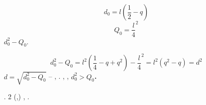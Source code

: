 \documentclass[a4paper]{article}
\begin{document}
\begin{equation*}
d_0=l\left(\frac 1 2-q\right)
\end{equation*}
\begin{equation*}
Q_0=\frac l 4^2
\end{equation*}
{\CYRR}{\cyra}{\cyrs}{\cyrs}{\cyrm}{\cyro}{\cyrt}{\cyrr}{\cyri}{\cyrm}
{\cyrk}{\cyro}{\cyrm}{\cyrb}{\cyri}{\cyrn}{\cyra}{\cyrc}{\cyri}{\cyryu}  $d_0^2-Q_0$.

\begin{equation*}
d_0^2-Q_0=l^2\left(\frac 1 4-q+q^2\right)-\frac l 4^2=l^2\left(q^2-q\right)=d^2
\end{equation*}
 $d=\sqrt{d_0^2-Q_0}$ -- {\cyrerev}{\cyrf}{\cyrf}{\cyre}{\cyrk}{\cyrt}{\cyri}{\cyrv}{\cyrn}{\cyrery}{\cyrishrt}
{\cyrd}{\cyri}{\cyrp}{\cyro}{\cyrl}{\cyrsftsn}{\cyrn}{\cyrery}{\cyrishrt} {\cyrm}{\cyro}{\cyrm}{\cyre}{\cyrn}{\cyrt},
{\cyri}{\cyrn}{\cyrv}{\cyra}{\cyrr}{\cyri}{\cyra}{\cyrn}{\cyrt}{\cyrn}{\cyrery}{\cyrishrt}
{\cyro}{\cyrt}{\cyrn}{\cyro}{\cyrs}{\cyri}{\cyrt}{\cyre}{\cyrl}{\cyrsftsn}{\cyrn}{\cyro}
{\cyrv}{\cyrery}{\cyrb}{\cyro}{\cyrr}{\cyra} {\cyrs}{\cyri}{\cyrs}{\cyrt}{\cyre}{\cyrm}{\cyrery}
{\cyro}{\cyrt}{\cyrs}{\cyrch}{\cyre}{\cyrt}{\cyra}. {\CYRO}{\cyrb}{\cyrr}{\cyra}{\cyrt}{\cyri}{\cyrm}
{\cyrv}{\cyrn}{\cyri}{\cyrm}{\cyra}{\cyrn}{\cyri}{\cyre} {\cyrn}{\cyra} {\cyrt}{\cyro}, {\cyrch}{\cyrt}{\cyro}
{\cyrt}{\cyra}{\cyrk}{\cyra}{\cyrya} {\cyrk}{\cyro}{\cyrm}{\cyrb}{\cyri}{\cyrn}{\cyra}{\cyrc}{\cyri}{\cyrya}
{\cyrs}{\cyru}{\cyrshch}{\cyre}{\cyrs}{\cyrt}{\cyrv}{\cyru}{\cyre}{\cyrt}
{\cyrt}{\cyro}{\cyrl}{\cyrsftsn}{\cyrk}{\cyro} {\cyrv} {\cyrt}{\cyro}{\cyrm}
{\cyrs}{\cyrl}{\cyru}{\cyrch}{\cyra}{\cyre}, {\cyre}{\cyrs}{\cyrl}{\cyri}  $d_0^2>Q_0$\textbf{.}

{\CYRN}{\cyra} {\cyrr}{\cyri}{\cyrs}. 2 ({\cyra},{\cyrb})
{\cyrp}{\cyrr}{\cyri}{\cyrv}{\cyre}{\cyrd}{\cyre}{\cyrn}{\cyro}
{\cyrs}{\cyrr}{\cyra}{\cyrv}{\cyrn}{\cyre}{\cyrn}{\cyri}{\cyre}
{\cyrd}{\cyrv}{\cyru}{\cyrh}{\cyrc}{\cyre}{\cyrn}{\cyrt}{\cyrr}{\cyro}{\cyrv}{\cyro}{\cyrg}{\cyro}
{\cyrp}{\cyro}{\cyrt}{\cyre}{\cyrn}{\cyrc}{\cyri}{\cyra}{\cyrl}{\cyra} {\cyrs}
{\cyrd}{\cyri}{\cyrp}{\cyro}{\cyrl}{\cyrsftsn}{\cyrn}{\cyrery}{\cyrm},
{\cyrp}{\cyro}{\cyrs}{\cyrt}{\cyrr}{\cyro}{\cyre}{\cyrn}{\cyrn}{\cyrery}{\cyrm} {\cyrt}{\cyra}{\cyrk}{\cyri}{\cyrm}
{\cyro}{\cyrb}{\cyrr}{\cyra}{\cyrz}{\cyro}{\cyrm}.
\end{document}

